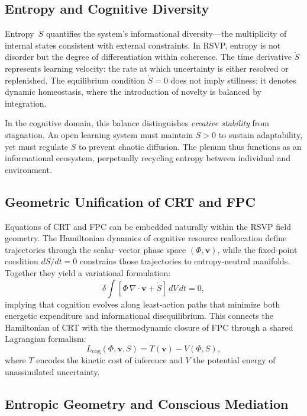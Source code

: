 \documentclass[12pt,a4paper]{article}
\begin{document}
\subsection{Entropy and Cognitive Diversity}

Entropy~$S$ quantifies the system’s informational diversity—the multiplicity of internal states consistent with external constraints.
In RSVP, entropy is not disorder but the degree of differentiation within coherence.
The time derivative $\dot{S}$ represents learning velocity: the rate at which uncertainty is either resolved or replenished.
The equilibrium condition $\dot{S}=0$ does not imply stillness; it denotes dynamic homeostasis, where the introduction of novelty is balanced by integration.

In the cognitive domain, this balance distinguishes \emph{creative stability} from stagnation.
An open learning system must maintain $S>0$ to sustain adaptability, yet must regulate $\dot{S}$ to prevent chaotic diffusion.
The plenum thus functions as an informational ecosystem, perpetually recycling entropy between individual and environment.

\subsection{Geometric Unification of CRT and FPC}

Equations of CRT and FPC can be embedded naturally within the RSVP field geometry.
The Hamiltonian dynamics of cognitive resource reallocation define trajectories through the scalar–vector phase space $(\Phi,\mathbf{v})$, while the fixed-point condition $dS/dt=0$ constrains those trajectories to entropy-neutral manifolds.
Together they yield a variational formulation:
\begin{equation}
\delta\!\int \!\left[\Phi\,\nabla\!\cdot\mathbf{v} + \dot{S}\right]\,dV\,dt=0,
\end{equation}
implying that cognition evolves along least-action paths that minimize both energetic expenditure and informational disequilibrium.
This connects the Hamiltonian of CRT with the thermodynamic closure of FPC through a shared Lagrangian formalism:
\[
L_{\mathrm{cog}}(\Phi,\mathbf{v},S)
= T(\mathbf{v})-V(\Phi,S),
\]
where $T$ encodes the kinetic cost of inference and $V$ the potential energy of unassimilated uncertainty.

\subsection{Entropic Geometry and Conscious Mediation}
\end{document}
